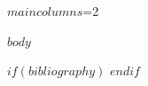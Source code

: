 \documentclass[12pt]{article}
\newif\ifjncanon
\newcommand{\jncmaincolumns}{$maincolumns$}
\newcommand{\jncmaincolumns}{1}
\begin{document}
\clearpage
\setcounter{page}{1}


\ifnum\jncmaincolumns=2\relax
  \twocolumn
\fi

\ifjncanon
\begingroup
\small
\noindent\textit{This manuscript is set to anonymous mode. Identifying metadata fields are suppressed on the title page.}\par
\endgroup
\vspace{1em}
\fi

$body$

$if(bibliography)$
\clearpage
$endif$
\end{document}
